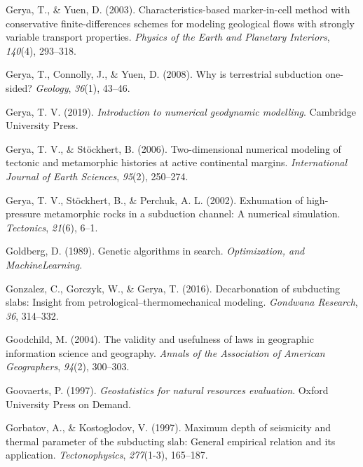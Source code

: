 \begin{CSLReferences}{1}{1}
\leavevmode{}%
Gerya, T., \& Yuen, D. (2003). Characteristics-based marker-in-cell method with conservative finite-differences schemes for modeling geological flows with strongly variable transport properties. \emph{Physics of the Earth and Planetary Interiors}, \emph{140}(4), 293--318.

\leavevmode{}%
Gerya, T., Connolly, J., \& Yuen, D. (2008). Why is terrestrial subduction one-sided? \emph{Geology}, \emph{36}(1), 43--46.

\leavevmode{}%
Gerya, T. V. (2019). \emph{Introduction to numerical geodynamic modelling}. Cambridge University Press.

\leavevmode{}%
Gerya, T. V., \& Stöckhert, B. (2006). Two-dimensional numerical modeling of tectonic and metamorphic histories at active continental margins. \emph{International Journal of Earth Sciences}, \emph{95}(2), 250--274.

\leavevmode{}%
Gerya, T. V., Stöckhert, B., \& Perchuk, A. L. (2002). Exhumation of high-pressure metamorphic rocks in a subduction channel: A numerical simulation. \emph{Tectonics}, \emph{21}(6), 6--1.

\leavevmode{}%
Goldberg, D. (1989). Genetic algorithms in search. \emph{Optimization, and MachineLearning}.

\leavevmode{}%
Gonzalez, C., Gorczyk, W., \& Gerya, T. (2016). Decarbonation of subducting slabs: Insight from petrological--thermomechanical modeling. \emph{Gondwana Research}, \emph{36}, 314--332.

\leavevmode{}%
Goodchild, M. (2004). The validity and usefulness of laws in geographic information science and geography. \emph{Annals of the Association of American Geographers}, \emph{94}(2), 300--303.

\leavevmode{}%
Goovaerts, P. (1997). \emph{Geostatistics for natural resources evaluation}. Oxford University Press on Demand.

\leavevmode{}%
Gorbatov, A., \& Kostoglodov, V. (1997). Maximum depth of seismicity and thermal parameter of the subducting slab: General empirical relation and its application. \emph{Tectonophysics}, \emph{277}(1-3), 165--187.


\end{CSLReferences}
